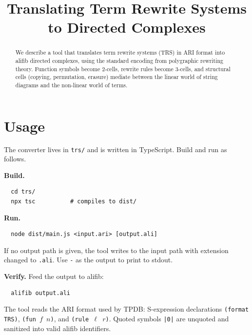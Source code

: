 \documentclass[acmsmall,screen,nonacm]{acmart}
\newcommand{\alifib}{\textsf{alifib}}
\begin{document}
\title{Translating Term Rewrite Systems to Directed Complexes}
\author{} \date{}
\maketitle

\begin{abstract}
We describe a tool that translates term rewrite systems (TRS) in ARI
format into \alifib{} directed complexes, using the standard encoding
from polygraphic rewriting theory.  Function symbols become
$2$\nobreakdash-cells, rewrite rules become $3$\nobreakdash-cells, and
structural cells (copying, permutation, erasure) mediate between the
linear world of string diagrams and the non-linear world of terms.
\end{abstract}

\tableofcontents

\section{Usage}
\label{sec:usage}

The converter lives in \texttt{trs/} and is written in TypeScript.
Build and run as follows.

\medskip\noindent\textbf{Build.}
\begin{verbatim}
  cd trs/
  npx tsc          # compiles to dist/
\end{verbatim}

\noindent\textbf{Run.}
\begin{verbatim}
  node dist/main.js <input.ari> [output.ali]
\end{verbatim}
If no output path is given, the tool writes to the input path with
extension changed to \texttt{.ali}.  Use \texttt{-} as the output to
print to stdout.

\medskip\noindent\textbf{Verify.}
Feed the output to \alifib:
\begin{verbatim}
  alifib output.ali
\end{verbatim}

\noindent The tool reads the ARI format used by TPDB: S-expression
declarations \texttt{(format TRS)}, \texttt{(fun $f$ $n$)}, and
\texttt{(rule $\ell$ $r$)}.  Quoted symbols \texttt{|0|} are unquoted
and sanitized into valid \alifib{} identifiers.

\end{document}
